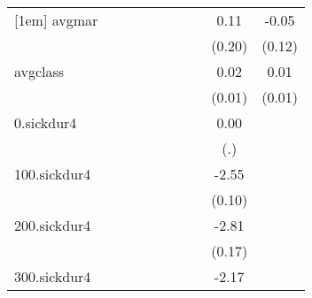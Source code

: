 \documentclass{article}
\begin{document}
{\begin{tabular}{l*{9}{c}}
[1em]
avgmar      &                     &                     &                     &                     &                     &                     &                     &        0.11         &       -0.05         \\
            &                     &                     &                     &                     &                     &                     &                     &      (0.20)         &      (0.12)         \\
[1em]
avgclass    &                     &                     &                     &                     &                     &                     &                     &        0.02         &        0.01\sym{*}  \\
            &                     &                     &                     &                     &                     &                     &                     &      (0.01)         &      (0.01)         \\
[1em]
0.sickdur4  &                     &                     &                     &                     &                     &                     &                     &        0.00         &                     \\
            &                     &                     &                     &                     &                     &                     &                     &         (.)         &                     \\
[1em]
100.sickdur4&                     &                     &                     &                     &                     &                     &                     &       -2.55\sym{***}&                     \\
            &                     &                     &                     &                     &                     &                     &                     &      (0.10)         &                     \\
[1em]
200.sickdur4&                     &                     &                     &                     &                     &                     &                     &       -2.81\sym{***}&                     \\
            &                     &                     &                     &                     &                     &                     &                     &      (0.17)         &                     \\
[1em]
300.sickdur4&                     &                     &                     &                     &                     &                     &                     &       -2.17\sym{***}&                     \\

\end{tabular}}
\end{document}
